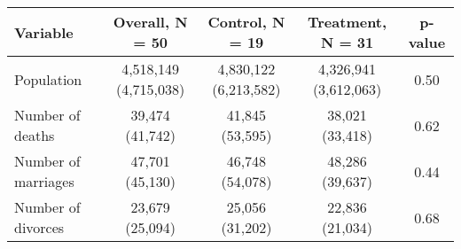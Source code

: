 
\begin{tabular}{lcccc}
\toprule
Variable & Overall, N = 50 & Control, N = 19 & Treatment, N = 31 & p-value\\
\midrule
Population & 4,518,149 (4,715,038) & 4,830,122 (6,213,582) & 4,326,941 (3,612,063) & 0.50\\
Number of deaths & 39,474 (41,742) & 41,845 (53,595) & 38,021 (33,418) & 0.62\\
Number of marriages & 47,701 (45,130) & 46,748 (54,078) & 48,286 (39,637) & 0.44\\
Number of divorces & 23,679 (25,094) & 25,056 (31,202) & 22,836 (21,034) & 0.68\\
\bottomrule
\end{tabular}